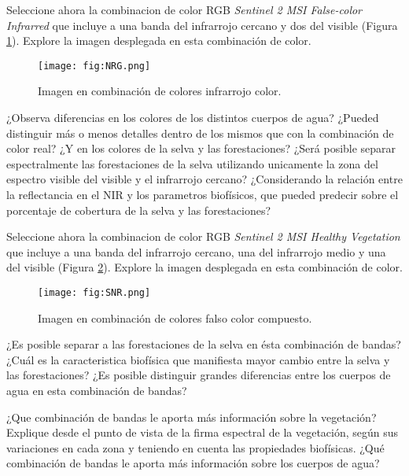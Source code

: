 Seleccione ahora la combinacion de color RGB \emph{Sentinel 2 MSI False-color Infrarred} que incluye a una banda del infrarrojo cercano y dos del visible (Figura \ref{fig:NRG}). Explore la imagen desplegada en esta combinación de color.

\begin{figure}[h!]
    \centering
    \texttt{[image: fig:NRG.png]}
    \caption{Imagen en combinación de colores infrarrojo color.}
    \label{fig:NRG}
\end{figure}

\begin{que}
    ¿Observa diferencias en los colores de los distintos cuerpos de agua? ¿Pueded distinguir más o menos detalles dentro de los mismos que con la combinación de color real? ¿Y en los colores de la selva y las forestaciones? ¿Será posible separar espectralmente las forestaciones de la selva utilizando unicamente la zona del espectro visible del visible y el infrarrojo cercano? ¿Considerando la relación entre la reflectancia en el NIR y los parametros biofísicos, que pueded predecir sobre el porcentaje de cobertura de la selva y las forestaciones?
\end{que}

Seleccione ahora la combinacion de color RGB \emph{Sentinel 2 MSI Healthy Vegetation} que incluye a una banda del infrarrojo cercano, una del infrarrojo medio y una del visible (Figura \ref{fig:SNR}). Explore la imagen desplegada en esta combinación de color.

\begin{figure}[h!]
    \centering
    \texttt{[image: fig:SNR.png]}
    \caption{Imagen en combinación de colores falso color compuesto.}
    \label{fig:SNR}
\end{figure}


\begin{que}
    ¿Es posible separar a las forestaciones de la selva en ésta combinación de bandas? ¿Cuál es la caracteristica biofísica que  manifiesta mayor cambio entre la selva y las forestaciones? ¿Es posible distinguir grandes diferencias entre los cuerpos de agua en esta combinación de bandas?
\end{que}

\begin{que}
    ¿Que combinación de bandas le aporta más información sobre la vegetación? Explique desde el punto de vista de la firma espectral de la vegetación,  según sus variaciones en cada zona y teniendo en cuenta las propiedades biofísicas. ¿Qué combinación de bandas le aporta más información sobre los cuerpos de agua?
\end{que}


